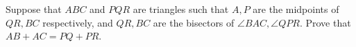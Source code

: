 Suppose that $ABC$ and $PQR$ are triangles such that $A,P$ are the midpoints of $QR,BC$ respectively, and $QR,BC$ are the bisectors of $\angle BAC,\angle QPR$. Prove that $AB+AC=PQ+PR$.